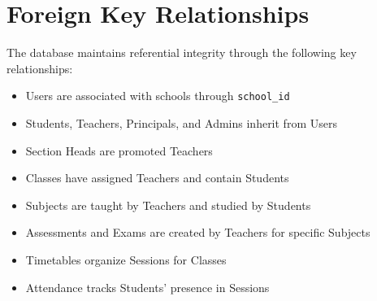 \documentclass[11pt,a4paper]{article}
\begin{document}
\section{Foreign Key Relationships}

The database maintains referential integrity through the following key relationships:

\begin{itemize}
    \item Users are associated with schools through \texttt{school\_id}
    \item Students, Teachers, Principals, and Admins inherit from Users
    \item Section Heads are promoted Teachers
    \item Classes have assigned Teachers and contain Students
    \item Subjects are taught by Teachers and studied by Students
    \item Assessments and Exams are created by Teachers for specific Subjects
    \item Timetables organize Sessions for Classes
    \item Attendance tracks Students' presence in Sessions
\end{itemize}
\end{document}
